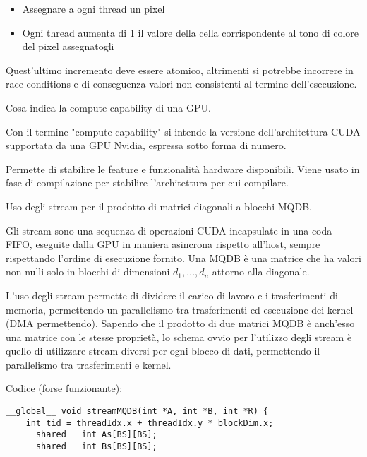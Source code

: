 \begin{questions}
\begin{solution}
\begin{itemize}
    		\item Assegnare a ogni thread un pixel
    		
    		\item Ogni thread aumenta di 1 il valore della cella corrispondente al tono di colore del pixel assegnatogli
    	\end{itemize}
    	
    	Quest'ultimo incremento deve essere atomico, altrimenti si potrebbe incorrere in race conditions e di conseguenza valori non consistenti al termine dell'esecuzione.
    \end{solution}
    
    \question Cosa indica la compute capability di una GPU.
    
    \begin{solution}
        Con il termine "compute capability" si intende la versione dell'architettura CUDA supportata da una GPU Nvidia, espressa sotto forma di numero.
        
        Permette di stabilire le feature e funzionalità hardware disponibili. Viene usato in fase di compilazione per stabilire l'architettura per cui compilare.
    \end{solution}
    
    \question Uso degli stream per il prodotto di matrici diagonali a blocchi MQDB.
    
    \begin{solution}
    	Gli stream sono una sequenza di operazioni CUDA incapsulate in una coda FIFO, eseguite dalla GPU in maniera asincrona rispetto all'host, sempre rispettando l'ordine di esecuzione fornito. Una MQDB è una matrice che ha valori non nulli solo in blocchi di dimensioni $d_1, \dots, d_n$ attorno alla diagonale.
    	
    	L'uso degli stream permette di dividere il carico di lavoro e i trasferimenti di memoria, permettendo un parallelismo tra trasferimenti ed esecuzione dei kernel (DMA permettendo). Sapendo che il prodotto di due matrici MQDB è anch'esso una matrice con le stesse proprietà, lo schema ovvio per l'utilizzo degli stream è quello di utilizzare stream diversi per ogni blocco di dati, permettendo il parallelismo tra trasferimenti e kernel.
    	
    	Codice (forse funzionante):
    	\begin{verbatim}
__global__ void streamMQDB(int *A, int *B, int *R) {
    int tid = threadIdx.x + threadIdx.y * blockDim.x;
    __shared__ int As[BS][BS];
    __shared__ int Bs[BS][BS];
	

\end{verbatim}
\end{solution}
\end{questions}
